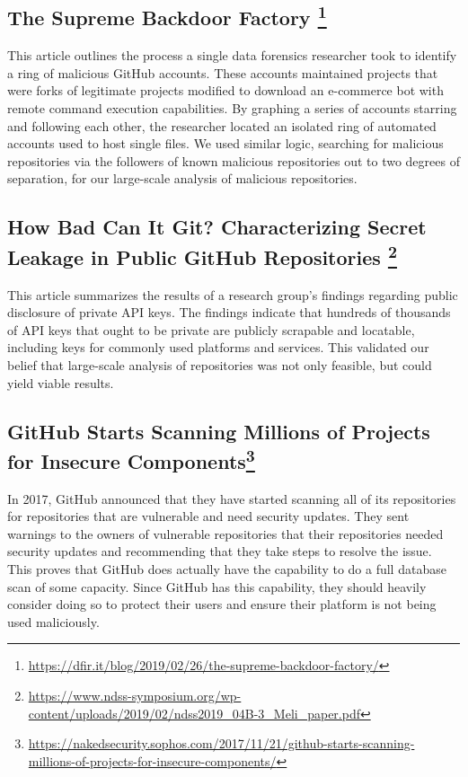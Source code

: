 \documentclass[]{acmart}
\begin{document}
\subsection[The Supreme Backdoor Factory]{The Supreme Backdoor Factory         \footnote{\url{https://dfir.it/blog/2019/02/26/the-supreme-backdoor-factory/}}
}
This article outlines the process a single data forensics researcher took to identify a ring of malicious GitHub accounts. These accounts maintained projects that were  forks of legitimate projects modified to download an e-commerce bot with remote command execution capabilities. By graphing a series of accounts starring and following each other, the researcher located an isolated ring of automated accounts used to host single files. We used similar logic, searching for malicious repositories via the followers of known malicious repositories out to two degrees of separation, for our large-scale analysis of malicious repositories.
\subsection[How Bad Can It Git? Characterizing Secret Leakage in Public GitHub Repositories]{How Bad Can It Git? Characterizing Secret Leakage in Public GitHub Repositories \footnote{\url{https://www.ndss-symposium.org/wp-content/uploads/2019/02/ndss2019_04B-3_Meli_paper.pdf}}
}
This article summarizes the results of a research group's findings regarding public disclosure of private API keys. The findings indicate that hundreds of thousands of API keys that ought to be private are publicly scrapable and locatable, including keys for commonly used platforms and services. This validated our belief that large-scale analysis of repositories was not only feasible, but could yield viable results.
\subsection[GitHub Starts Scanning Millions of Projects for Insecure Components]{GitHub Starts Scanning Millions of Projects for Insecure Components\footnote{\url{https://nakedsecurity.sophos.com/2017/11/21/github-starts-scanning-millions-of-projects-for-insecure-components/}}}
In 2017, GitHub announced that they have started scanning all of its repositories for repositories that are vulnerable and need security updates. They sent warnings to the owners of vulnerable repositories that their repositories needed security updates and recommending that they take steps to resolve the issue. This proves that GitHub does actually have the capability to do a full database scan of some capacity. Since GitHub has this capability, they should heavily consider doing so to protect their users and ensure their platform is not being used maliciously.
\end{document}
